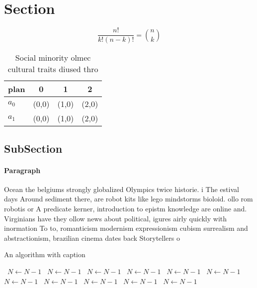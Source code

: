 \documentclass[a4paper]{article}
\begin{document}
\section{Section}

\[ \frac{n!}{k!(n-k)!} = \binom{n}{k} \]

\begin{table}
\begin{adjustbox}{width=0.6\columnwidth}
\begin{tabular}{|l|l|l|l|}
\hline
\textbf{plan} & \multicolumn{1}{c|}{\textbf{0}} & \multicolumn{1}{c|}{\textbf{1}} & \multicolumn{1}{c|}{\textbf{2}} \\ \hline
\textbf{$a_0$}  & (0,0) & (1,0) & (2,0) \\ \hline
\textbf{$a_1$}  & (0,0) & (1,0) & (2,0) \\ \hline
\end{tabular}
\end{adjustbox}
\caption{Social minority olmec cultural traits diused thro
}
\end{table}

\subsection{SubSection}

\paragraph{Paragraph}
Ocean the belgiums strongly globalized Olympics twice historie. i The estival days Around sediment there, are robot kits like lego mindstorms bioloid. ollo rom robotis or A predicate kerner, introduction to epistm knowledge are online and. Virginians have they ollow news about political, igures airly quickly with inormation To to, romanticism modernism expressionism cubism surrealism and abstractionism, brazilian cinema dates back Storytellers o


\begin{algorithm}
\caption{An algorithm with caption}
\begin{algorithmic}
\    \State $N \gets N - 1$
\    \State $N \gets N - 1$
\    \State $N \gets N - 1$
\    \State $N \gets N - 1$
\    \State $N \gets N - 1$
\    \State $N \gets N - 1$
\    \State $N \gets N - 1$
\    \State $N \gets N - 1$
\    \State $N \gets N - 1$
\    \State $N \gets N - 1$
\    \State $N \gets N - 1$
\EndWhile
\end{algorithmic}
\end{algorithm}
\end{document}
